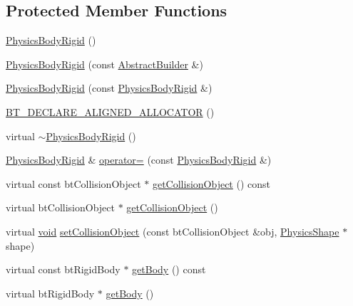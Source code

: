 \subsection*{Protected Member Functions}
\begin{DoxyCompactItemize}
\item 
\mbox{\hyperlink{classnjli_1_1_physics_body_rigid_ae94e7b3c64a48854e5e35a8e1d298afb}{Physics\+Body\+Rigid}} ()
\item 
\mbox{\hyperlink{classnjli_1_1_physics_body_rigid_a43b90ad880516b3b0c007b598cccfb21}{Physics\+Body\+Rigid}} (const \mbox{\hyperlink{classnjli_1_1_abstract_builder}{Abstract\+Builder}} \&)
\item 
\mbox{\hyperlink{classnjli_1_1_physics_body_rigid_a448ff60fc10c6608e182165535c73bd7}{Physics\+Body\+Rigid}} (const \mbox{\hyperlink{classnjli_1_1_physics_body_rigid}{Physics\+Body\+Rigid}} \&)
\item 
\mbox{\hyperlink{classnjli_1_1_physics_body_rigid_a2c023043cbc9f56703704cb4f822f963}{B\+T\+\_\+\+D\+E\+C\+L\+A\+R\+E\+\_\+\+A\+L\+I\+G\+N\+E\+D\+\_\+\+A\+L\+L\+O\+C\+A\+T\+OR}} ()
\item 
virtual \mbox{\hyperlink{classnjli_1_1_physics_body_rigid_a7721538446401b34a6922d400412fc29}{$\sim$\+Physics\+Body\+Rigid}} ()
\item 
\mbox{\hyperlink{classnjli_1_1_physics_body_rigid}{Physics\+Body\+Rigid}} \& \mbox{\hyperlink{classnjli_1_1_physics_body_rigid_a5dadde62b5baa8c4c9c30d318b03c1f7}{operator=}} (const \mbox{\hyperlink{classnjli_1_1_physics_body_rigid}{Physics\+Body\+Rigid}} \&)
\item 
virtual const bt\+Collision\+Object $\ast$ \mbox{\hyperlink{classnjli_1_1_physics_body_rigid_aa92b1f7c329ae49a2ad80947db1dd7ba}{get\+Collision\+Object}} () const
\item 
virtual bt\+Collision\+Object $\ast$ \mbox{\hyperlink{classnjli_1_1_physics_body_rigid_a47bfa192d6de09d5ce0486ed2cc09831}{get\+Collision\+Object}} ()
\item 
virtual \mbox{\hyperlink{_thread_8h_af1e856da2e658414cb2456cb6f7ebc66}{void}} \mbox{\hyperlink{classnjli_1_1_physics_body_rigid_a772e64b569e190f647047c0c5be2a852}{set\+Collision\+Object}} (const bt\+Collision\+Object \&obj, \mbox{\hyperlink{classnjli_1_1_physics_shape}{Physics\+Shape}} $\ast$shape)
\item 
virtual const bt\+Rigid\+Body $\ast$ \mbox{\hyperlink{classnjli_1_1_physics_body_rigid_a03cf3d38b4083b61dcffcb1a5327213d}{get\+Body}} () const
\item 
virtual bt\+Rigid\+Body $\ast$ \mbox{\hyperlink{classnjli_1_1_physics_body_rigid_abe9121bf7697467e7eddd8cd5da2cdd5}{get\+Body}} ()

\end{DoxyCompactItemize}
